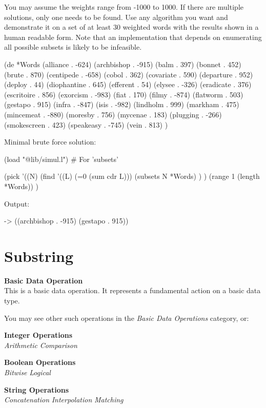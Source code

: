 \begin{itemize}
You may assume the weights range from -1000 to 1000. If there are
multiple solutions, only one needs to be found. Use any algorithm you
want and demonstrate it on a set of at least 30 weighted words with the
results shown in a human readable form. Note that an implementation that
depends on enumerating all possible subsets is likely to be infeasible.

\begin{wideverbatim}

(de *Words
   (alliance . -624) (archbishop . -915) (balm . 397) (bonnet . 452)
   (brute . 870) (centipede . -658) (cobol . 362) (covariate . 590)
   (departure . 952) (deploy . 44) (diophantine . 645) (efferent . 54)
   (elysee . -326) (eradicate . 376) (escritoire . 856) (exorcism . -983)
   (fiat . 170) (filmy . -874) (flatworm . 503) (gestapo . 915)
   (infra . -847) (isis . -982) (lindholm . 999) (markham . 475)
   (mincemeat . -880) (moresby . 756) (mycenae . 183) (plugging . -266)
   (smokescreen . 423) (speakeasy . -745) (vein . 813) )

Minimal brute force solution:

(load "@lib/simul.l")  # For 'subsets'

(pick
   '((N)
      (find '((L) (=0 (sum cdr L)))
         (subsets N *Words) ) )
   (range 1 (length *Words)) )

Output:

-> ((archbishop . -915) (gestapo . 915))

\end{wideverbatim}

\pagebreak{}
\section*{Substring}

\textbf{Basic Data Operation}\\ This is a basic data operation. It
represents a fundamental action on a basic data type.

You may see other such operations in the
\emph{Basic Data Operations}
category, or:

\textbf{Integer Operations} \\
\emph{Arithmetic} \textbar{}
\emph{Comparison}

\textbf{Boolean Operations} \\ \emph{Bitwise}
\textbar{} \emph{Logical}

\textbf{String Operations} \\
\emph{Concatenation} \textbar{}
\emph{Interpolation} \textbar{}
\emph{Matching}


\end{itemize}
